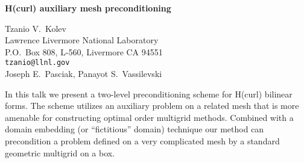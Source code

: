 \documentclass{report}
\begin{document}

\begin{center}
{\large
{\bf H(curl) auxiliary mesh preconditioning}}

	Tzanio V.~Kolev \\
	Lawrence Livermore National Laboratory \\
	P.O.~Box 808, L-560, Livermore CA 94551 \\
	{\tt tzanio@llnl.gov} \\
	Joseph E.~Pasciak, Panayot S.~Vassilevski
\end{center}
In this talk we present a two-level preconditioning scheme
for H(curl) bilinear forms. The scheme utilizes an auxiliary
problem on a related mesh that is more amenable for
constructing optimal order multigrid methods. Combined with
a domain embedding (or ``fictitious'' domain) technique our
method can precondition a problem defined on a very
complicated mesh by a standard geometric multigrid on a box.



\end{document}

